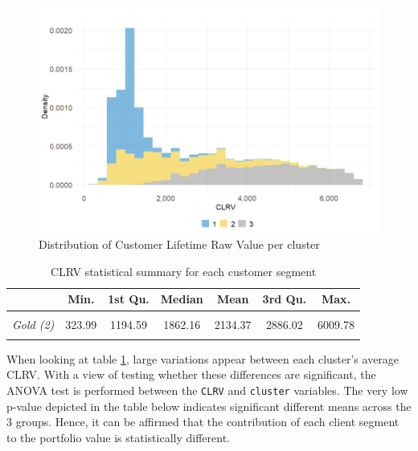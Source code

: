 \documentclass[
]{book}
\begin{document}
\begin{figure}

{\centering \includegraphics[width=12.5in]{./imgs/clrv_density_per_cluster} 

}

\caption{Distribution of Customer Lifetime Raw Value per cluster}\label{fig:clrvDensClust}
\end{figure}

\begin{table}[H]

\caption{\label{tab:custValuesclust}CLRV statistical summary for each customer segment}
\centering
\begin{tabular}[t]{>{}lcccccc}
\toprule
  & Min. & 1st Qu. & Median & Mean & 3rd Qu. & Max.\\
\midrule
\em{\cellcolor{gray!6}{Silver (1)}} & \cellcolor{gray!6}{333.82} & \cellcolor{gray!6}{837.50} & \cellcolor{gray!6}{1094.51} & \cellcolor{gray!6}{1134.40} & \cellcolor{gray!6}{1264.28} & \cellcolor{gray!6}{4679.80}\\
\em{Gold (2)} & 323.99 & 1194.59 & 1862.16 & 2134.37 & 2886.02 & 6009.78\\
\em{\cellcolor{gray!6}{Platinum (3)}} & \cellcolor{gray!6}{1268.74} & \cellcolor{gray!6}{3393.93} & \cellcolor{gray!6}{4489.62} & \cellcolor{gray!6}{4408.44} & \cellcolor{gray!6}{5454.71} & \cellcolor{gray!6}{6815.42}\\
\bottomrule
\end{tabular}
\end{table}

When looking at table \ref{tab:custValuesclust}, large variations appear between each cluster's average CLRV. With a view of testing whether these differences are significant, the ANOVA test is performed between the \texttt{CLRV} and \texttt{cluster} variables. The very low p-value depicted in the table below indicates significant different means across the 3 groups. Hence, it can be affirmed that the contribution of each client segment to the portfolio value is statistically different.
\end{document}
